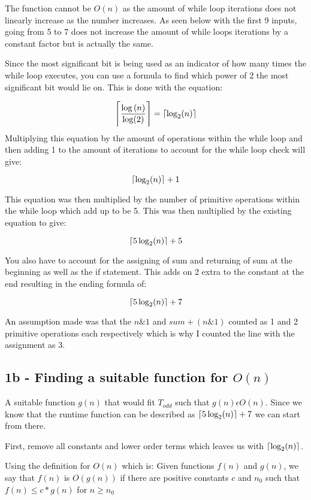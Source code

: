 \documentclass[oneside, a4paper]{article}
\DeclarePairedDelimiter\ceil{\lceil}{\rceil}
\begin{document}
The function cannot be $O(n)$ as the amount of while loop iterations does not linearly increase as the number increases. As seen below with the first 9 inputs, going from 5 to 7 does not increase the amount of while loops iterations by a constant factor but is actually the same.



Since the most significant bit is being used as an indicator of how many times the while loop executes, you can use a formula to find which power of 2 the most significant bit would lie on. This is done with the equation:

$$\ceil[\Bigg]{\frac{\log{(n)}}{\log(2)}} = \ceil{\log_2(n)}$$ 
Multiplying this equation by the amount of operations within the while loop and then adding 1 to the amount of iterations to account for the while loop check will give:

$$\ceil{\log_2(n)}+ 1$$ 

This equation was then multiplied by the number of primitive operations within the while loop which add up to be 5. This was then multiplied by the existing equation to give:

$$\ceil{5\log_2(n)} + 5$$ 

You also have to account for the assigning of sum and returning of sum at the beginning as well as the if statement. This adds on 2 extra to the constant at the end resulting in the ending formula of:

$$\ceil{5\log_2(n)} + 7$$ 

An assumption made was that the $n \& 1$ and $sum + (n \& 1)$ counted as 1 and 2 primitive operations each respectively which is why I counted the line with the assignment as 3.

\subsection*{1b - Finding a suitable function for $O(n)$}

A suitable function $g(n)$ that would fit $T_{odd}$ such that $g(n) \epsilon O(n)$. Since we know that the runtime function can be described as $\ceil{5\log_2(n)} + 7$ we can start from there.

First, remove all constants and lower order terms which leaves us with $\ceil{\log_2(n)}$. 

Using the definition for $O(n)$ which is:
Given functions $f(n)$ and $g(n)$, we say that $f(n)$ is $O(g(n))$ if there are positive constants $c$ and $n_0$ such that 
$f(n) \leq c * g(n)$ for $n \geq n_0$
\end{document}
